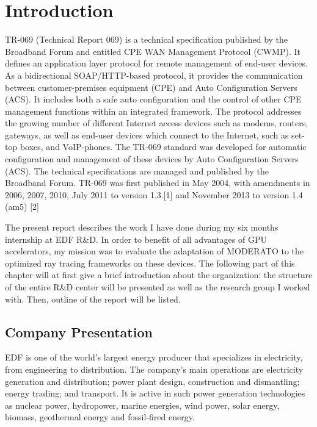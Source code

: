 
\chapter{Introduction} %

\label{Chapter1} %



TR-069 (Technical Report 069) is a technical specification published by the Broadband Forum and entitled CPE WAN Management Protocol (CWMP)\citep{Reference1}. It defines an application layer protocol for remote management of end-user devices. As a bidirectional SOAP/HTTP-based protocol, it provides the communication between customer-premises equipment (CPE) and Auto Configuration Servers (ACS). It includes both a safe auto configuration and the control of other CPE management functions within an integrated framework. The protocol addresses the growing number of different Internet access devices such as modems, routers, gateways, as well as end-user devices which connect to the Internet, such as set-top boxes, and VoIP-phones. The TR-069 standard was developed for automatic configuration and management of these devices by Auto Configuration Servers (ACS). The technical specifications are managed and published by the Broadband Forum. TR-069 was first published in May 2004, with amendments in 2006, 2007, 2010, July 2011 to version 1.3.[1] and November 2013 to version 1.4 (am5) [2]

The present report describes the work I have done during my six months internship at EDF R\&D. In order to benefit of all advantages of GPU accelerators, my mission was to evaluate the adaptation of MODERATO to the optimized ray tracing frameworks on these devices. The following part of this chapter will at first give a brief introduction about the organization: the structure of the entire R\&D center will be presented as well as the research group I worked with. Then, outline of the report will be listed.

\section{Company Presentation}
EDF \citep{edf} is one of the world's largest energy producer that specializes in electricity, from engineering to distribution. The company's main operations are electricity generation and distribution; power plant design, construction and dismantling; energy trading; and transport. It is active in such power generation technologies as nuclear power, hydropower, marine energies, wind power, solar energy, biomass, geothermal energy and fossil-fired energy.

